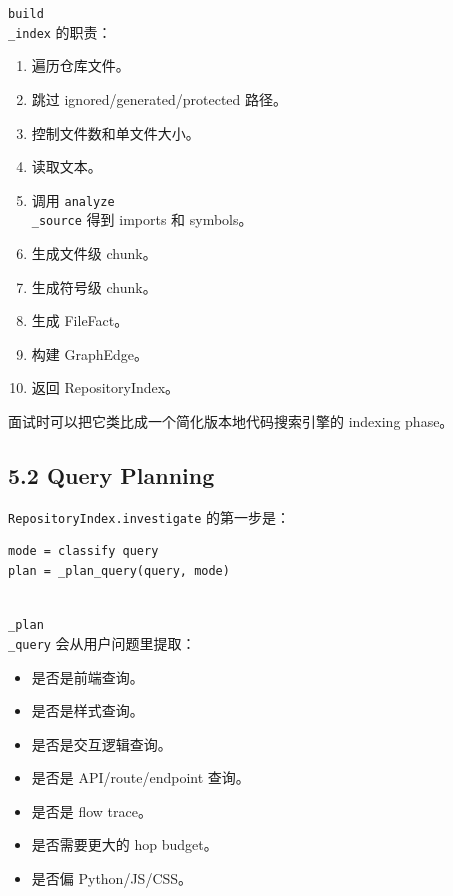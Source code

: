 \documentclass[UTF8,12pt,openany]{ctexbook}
\begin{document}
\texttt{build\\_index} 的职责：\par

\begin{enumerate}
\item 遍历仓库文件。
\item 跳过 ignored/generated/protected 路径。
\item 控制文件数和单文件大小。
\item 读取文本。
\item 调用 \texttt{analyze\\_source} 得到 imports 和 symbols。
\item 生成文件级 chunk。
\item 生成符号级 chunk。
\item 生成 FileFact。
\item 构建 GraphEdge。
\item 返回 RepositoryIndex。
\end{enumerate}

面试时可以把它类比成一个简化版本地代码搜索引擎的 indexing phase。\par

\subsection{5.2 Query Planning}

\texttt{RepositoryIndex.investigate} 的第一步是：\par

\begin{lstlisting}
mode = classify query
plan = _plan_query(query, mode)
\end{lstlisting}

\texttt{\\_plan\\_query} 会从用户问题里提取：\par

\begin{itemize}
\item 是否是前端查询。
\item 是否是样式查询。
\item 是否是交互逻辑查询。
\item 是否是 API/route/endpoint 查询。
\item 是否是 flow trace。
\item 是否需要更大的 hop budget。
\item 是否偏 Python/JS/CSS。
\end{itemize}
\end{document}
